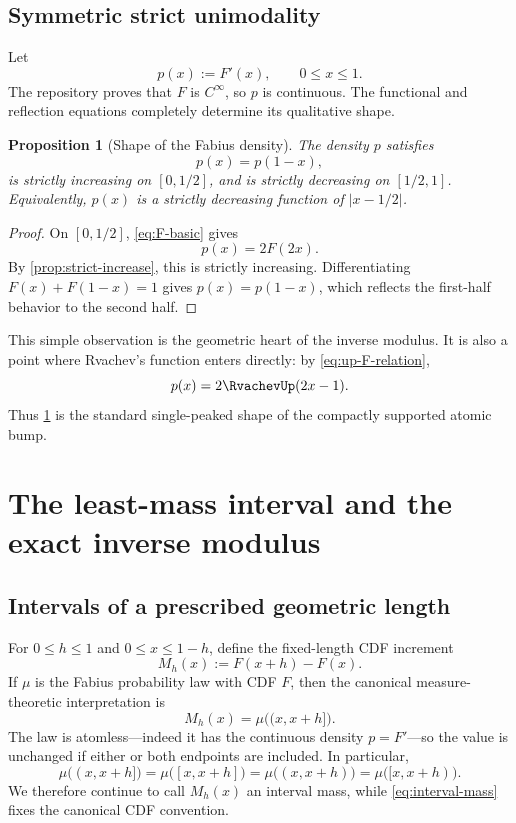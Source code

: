\documentclass[11pt,oneside]{article}
\newtheorem{proposition}[theorem]{Proposition}
\theoremstyle{definition}
\theoremstyle{remark}
\numberwithin{equation}{section}
\begin{document}
\subsection{Symmetric strict unimodality}

Let
\begin{equation}\label{eq:density-p}
 p(x):=F'(x),\qquad 0\le x\le1.
\end{equation}
The repository proves that $F$ is $C^\infty$, so $p$ is continuous.  The
functional and reflection equations completely determine its qualitative
shape.

\begin{proposition}[Shape of the Fabius density]\label{prop:density-shape}
The density $p$ satisfies
\begin{equation}\label{eq:density-symmetry}
 p(x)=p(1-x),
\end{equation}
is strictly increasing on $[0,1/2]$, and is strictly decreasing on
$[1/2,1]$.  Equivalently, $p(x)$ is a strictly decreasing function of
$|x-1/2|$.
\end{proposition}

\begin{proof}
On $[0,1/2]$, \eqref{eq:F-basic} gives
\[
 p(x)=2F(2x).
\]
By \cref{prop:strict-increase}, this is strictly increasing.  Differentiating
$F(x)+F(1-x)=1$ gives $p(x)=p(1-x)$, which reflects the first-half behavior
to the second half.
\end{proof}

This simple observation is the geometric heart of the inverse modulus.  It is
also a point where Rvachev's function enters directly: by
\eqref{eq:up-F-relation},
\begin{equation}\label{eq:p-up}
 p(x)=2\RvachevUp(2x-1).
\end{equation}
Thus \cref{prop:density-shape} is the standard single-peaked shape of the
compactly supported atomic bump.

\section{The least-mass interval and the exact inverse modulus}
\label{sec:exact-modulus}

\subsection{Intervals of a prescribed geometric length}

For $0\le h\le1$ and $0\le x\le1-h$, define the fixed-length CDF increment
\begin{equation}\label{eq:interval-mass}
 M_h(x):=F(x+h)-F(x).
\end{equation}
If $\mu$ is the Fabius probability law with CDF $F$, then the canonical
measure-theoretic interpretation is
\[
 M_h(x)=\mu\bigl((x,x+h]\bigr).
\]
The law is atomless---indeed it has the continuous density $p=F'$---so the
value is unchanged if either or both endpoints are included.  In particular,
\[
 \mu\bigl((x,x+h]\bigr)
 =\mu\bigl([x,x+h]\bigr)
 =\mu\bigl((x,x+h)\bigr)
 =\mu\bigl([x,x+h)\bigr).
\]
We therefore continue to call $M_h(x)$ an interval mass, while
\eqref{eq:interval-mass} fixes the canonical CDF convention.
\end{document}
